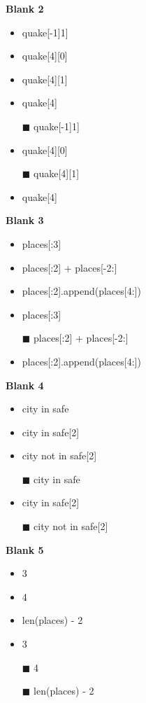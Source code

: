 \textbf{Blank 2}
\newline
\begin{itemize}
    \item quake[-1]1]
    \item quake[4][0]
    \item quake[4][1]
    \item quake[4]
\end{itemize}

\begin{solution}[.25in] 
\begin{itemize}
    \item[$\blacksquare$] quake[-1]1]
    \item quake[4][0]
    \item[$\blacksquare$] quake[4][1]
    \item quake[4]
\end{itemize}
\end{solution}

\textbf{Blank 3}
\newline
\begin{itemize}
    \item places[:3]
    \item places[:2] + places[-2:]
    \item places[:2].append(places[4:])
\end{itemize}
\begin{solution}[.25in]
\begin{itemize}
    \item places[:3]
    \item[$\blacksquare$] places[:2] + places[-2:]
    \item places[:2].append(places[4:])
\end{itemize}
\end{solution}

\textbf{Blank 4}
\newline
\begin{itemize}
    \item city in safe
    \item city in safe[2]
    \item city not in safe[2]
\end{itemize}
\begin{solution}[.25in]
\begin{itemize}
    \item[$\blacksquare$] city in safe
    \item city in safe[2]
    \item[$\blacksquare$] city not in safe[2]
\end{itemize}\end{solution}

\textbf{Blank 5}
\newline
\begin{itemize}
    \item 3
    \item 4
    \item len(places) - 2
\end{itemize}
\begin{solution}[.25in]
\begin{itemize}
    \item 3
    \item[$\blacksquare$] 4
    \item[$\blacksquare$] len(places) - 2
\end{itemize}
\end{solution}